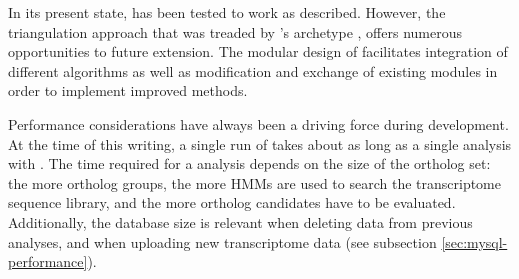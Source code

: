 \label{sec:future-devel}
In its present state, \pname has been tested to work as described. However, the
triangulation approach that was treaded by \pname's archetype \hamstr, offers
numerous opportunities to future extension. The modular design of \pname
facilitates integration of different algorithms as well as modification and
exchange of existing modules in order to implement improved methods.

Performance considerations have always been a driving force during development.
At the time of this writing, a single run of \pname takes about as long as a
single analysis with \hamstr. The time required for a \pname analysis depends on
the size of the ortholog set: the more ortholog groups, the more HMMs are used
to search the transcriptome sequence library, and the more ortholog candidates
have to be evaluated. Additionally, the database size is relevant when deleting
data from previous analyses, and when uploading new transcriptome data (see
subsection \ref{sec:mysql-performance}). 
